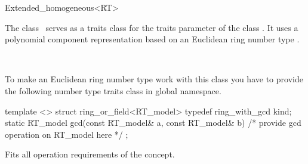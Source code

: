 
\ccAutoIndexingOff
\begin{ccRefClass}{Extended_homogeneous<RT>}
\ccAutoIndexingOn
{}

\ccDefinition
  
The class \ccRefName\ serves as a traits class for the traits
parameter  of the class .  It
uses a polynomial component representation based on an Euclidean ring
number type .


\ccIsModel

%
 \\

\ccCreation
{}  %



To make an Euclidean ring number type
 work with this class you have to provide the following
number type traits class in global namespace.

\begin{ccExampleCode}
template <>
struct ring_or_field<RT_model> {
  typedef ring_with_gcd kind;
  static RT_model gcd(const RT_model& a, const RT_model& b) 
  { /* provide gcd operation on RT_model here */ }
};    
\end{ccExampleCode}

\ccOperations

Fits all operation requirements of the concept.

\ccSeeAlso

 \\


\ccIndexTraitsClassEnd
\ccAutoIndexingOff
\end{ccRefClass}
\ccAutoIndexingOn

